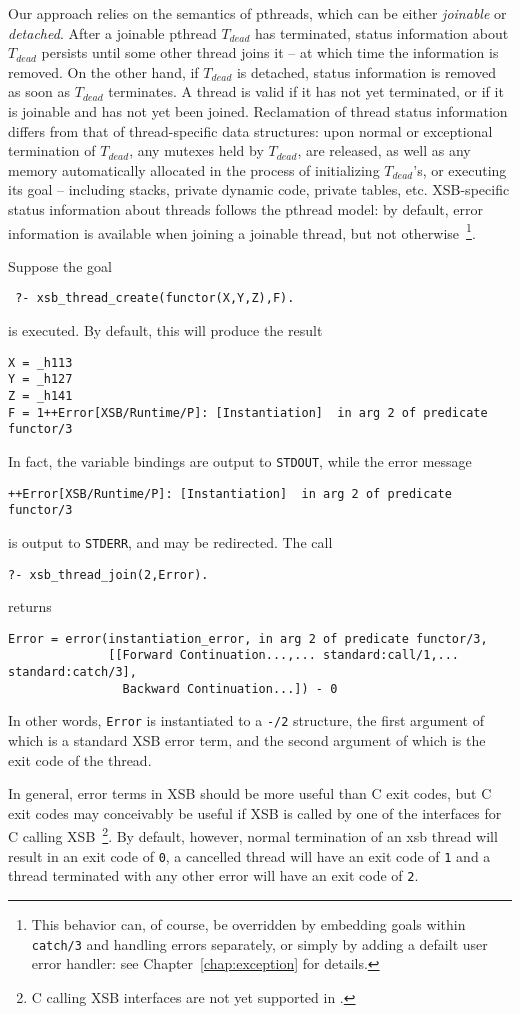 Our approach relies on the semantics of pthreads, which can be either
{\em joinable} or {\em detached}.  After a joinable pthread $T_{dead}$
has terminated, status information about $T_{dead}$ persists until
some other thread joins it -- at which time the information is
removed.  On the other hand, if $T_{dead}$ is detached, status
information is removed as soon as $T_{dead}$ terminates.  A thread is
valid if it has not yet terminated, or if it is joinable and has not
yet been joined.  Reclamation of thread status information differs
from that of thread-specific data structures: upon normal or
exceptional termination of $T_{dead}$, any mutexes held by $T_{dead}$,
are released, as well as any memory automatically allocated in the
process of initializing $T_{dead}$'s, or executing its goal --
including stacks, private dynamic code, private tables, etc.
XSB-specific status information about threads follows the pthread
model: by default, error information is available when joining a
joinable thread, but not otherwise~\footnote{This behavior can, of
  course, be overridden by embedding goals within {\tt catch/3} and
  handling errors separately, or simply by adding a defailt user error
  handler: see Chapter~\ref{chap:exception} for details.}.

\begin{example}
Suppose the goal 
\begin{verbatim}
 ?- xsb_thread_create(functor(X,Y,Z),F).
\end{verbatim}
%
is executed.  By default, this will produce the result
%
\begin{verbatim}
X = _h113
Y = _h127
Z = _h141
F = 1++Error[XSB/Runtime/P]: [Instantiation]  in arg 2 of predicate functor/3
\end{verbatim}
%
In fact, the variable bindings are output to {\tt STDOUT}, while the
error message
%
\begin{verbatim}
++Error[XSB/Runtime/P]: [Instantiation]  in arg 2 of predicate functor/3
\end{verbatim}
%
is output to {\tt STDERR}, and may be redirected.  The call
%
\begin{verbatim}
?- xsb_thread_join(2,Error).
\end{verbatim}
%
returns
%
\begin{verbatim}
Error = error(instantiation_error, in arg 2 of predicate functor/3,
              [[Forward Continuation...,... standard:call/1,... standard:catch/3],
                Backward Continuation...]) - 0
\end{verbatim}
%
In other words, {\tt Error} is instantiated to a {\tt -/2} structure,
the first argument of which is a standard XSB error term, and the
second argument of which is the exit code of the thread.  
\end{example}
%
In general, error terms in XSB should be more useful than C exit
codes, but C exit codes may conceivably be useful if XSB is called by
one of the interfaces for C calling XSB~\footnote{C calling XSB
  interfaces are not yet supported in \version.}.  By default,
however, normal termination of an xsb thread will result in an exit
code of {\tt 0}, a cancelled thread will have an exit code of {\tt 1}
and a thread terminated with any other error will have an exit code of
{\tt 2}.

